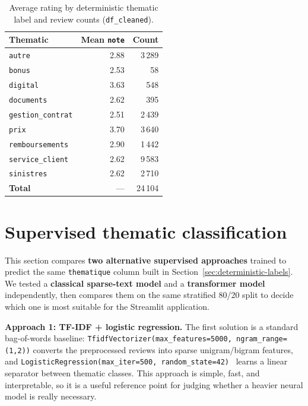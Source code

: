 \documentclass[11pt,a4paper]{article}
\begin{document}
\begin{table}[H]
  \centering
  \caption{Average rating by deterministic thematic label and review counts (\texttt{df\_cleaned}).}
  \label{tab:thematique-note}
  \begin{tabular}{lrr}
    \toprule
    Thematic & Mean \texttt{note} & Count \\
    \midrule
    \texttt{autre}            & 2.88 & 3\,289 \\
    \texttt{bonus}            & 2.53 & 58 \\
    \texttt{digital}          & 3.63 & 548 \\
    \texttt{documents}        & 2.62 & 395 \\
    \texttt{gestion\_contrat} & 2.51 & 2\,439 \\
    \texttt{prix}             & 3.70 & 3\,640 \\
    \texttt{remboursements}   & 2.90 & 1\,442 \\
    \texttt{service\_client}  & 2.62 & 9\,583 \\
    \texttt{sinistres}        & 2.62 & 2\,710 \\
    \midrule
    \textbf{Total}            & ---  & 24\,104 \\
    \bottomrule
  \end{tabular}
\end{table}

\FloatBarrier

\section{Supervised thematic classification}
\label{sec:supervised-thematic}
This section compares \textbf{two alternative supervised approaches} trained to predict the same \texttt{thematique} column built in Section~\ref{sec:deterministic-labels}. We tested a \textbf{classical sparse-text model} and a \textbf{transformer model} independently, then compares them on the same stratified 80/20 split to decide which one is most suitable for the Streamlit application.

\textbf{Approach 1: TF-IDF + logistic regression.} The first solution is a standard bag-of-words baseline: \texttt{TfidfVectorizer(max\_features=5000, ngram\_range=(1,2))} converts the preprocessed reviews into sparse unigram/bigram features, and \texttt{LogisticRegression(max\_iter=500, random\_state=42)}~\cite{ref:sklearn-tfidf} learns a linear separator between thematic classes. This approach is simple, fast, and interpretable, so it is a useful reference point for judging whether a heavier neural model is really necessary.
\end{document}
